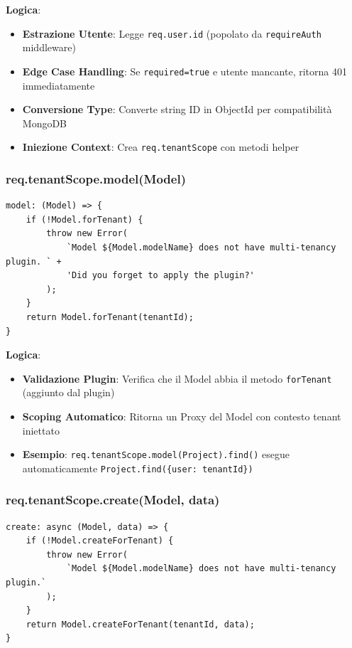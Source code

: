 \documentclass[11pt,a4paper]{article}
\begin{document}
\textbf{Logica}:
\begin{itemize}
    \item \textbf{Estrazione Utente}: Legge \texttt{req.user.id} (popolato da \texttt{requireAuth} middleware)
    \item \textbf{Edge Case Handling}: Se \texttt{required=true} e utente mancante, ritorna 401 immediatamente
    \item \textbf{Conversione Type}: Converte string ID in ObjectId per compatibilità MongoDB
    \item \textbf{Iniezione Context}: Crea \texttt{req.tenantScope} con metodi helper
\end{itemize}

\subsubsection{req.tenantScope.model(Model)}

\begin{lstlisting}
model: (Model) => {
    if (!Model.forTenant) {
        throw new Error(
            `Model ${Model.modelName} does not have multi-tenancy plugin. ` +
            'Did you forget to apply the plugin?'
        );
    }
    return Model.forTenant(tenantId);
}
\end{lstlisting}

\textbf{Logica}:
\begin{itemize}
    \item \textbf{Validazione Plugin}: Verifica che il Model abbia il metodo \texttt{forTenant} (aggiunto dal plugin)
    \item \textbf{Scoping Automatico}: Ritorna un Proxy del Model con contesto tenant iniettato
    \item \textbf{Esempio}: \texttt{req.tenantScope.model(Project).find()} esegue automaticamente \texttt{Project.find(\{user: tenantId\})}
\end{itemize}

\subsubsection{req.tenantScope.create(Model, data)}

\begin{lstlisting}
create: async (Model, data) => {
    if (!Model.createForTenant) {
        throw new Error(
            `Model ${Model.modelName} does not have multi-tenancy plugin.`
        );
    }
    return Model.createForTenant(tenantId, data);
}
\end{lstlisting}
\end{document}
